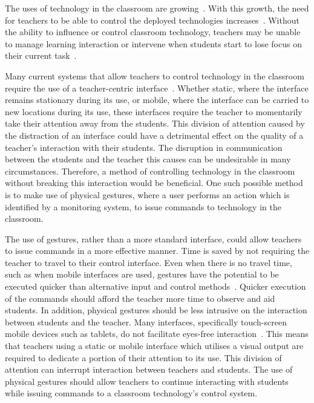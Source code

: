 \documentclass[manuscript, review, screen]{acmart}
\begin{document}
The uses of technology in the classroom are growing~\cite{Lloyd2011,Robertson2012,Schrum2008}.
With this growth, the need for teachers to be able to control the deployed technologies increases~\cite{Apple1990,Selwyn2010,Selwyn2011}.
Without the ability to influence or control classroom technology, teachers may be unable to manage learning interaction or intervene when students start to lose focus on their current task~\cite{Chen2005,Karabenick2011}.

Many current systems that allow teachers to control technology in the classroom require the use of a teacher-centric interface~\cite{Dagdag2011,Kuhn2005,Vila,Zhou2010}.
Whether static, where the interface remains stationary during its use, or mobile, where the interface can be carried to new locations during its use, these interfaces require the teacher to momentarily take their attention away from the students.
This division of attention caused by the distraction of an interface could have a detrimental effect on the quality of a teacher's interaction with their students.
The disruption in communication between the students and the teacher this causes can be undesirable in many circumstances.
Therefore, a method of controlling technology in the classroom without breaking this interaction would be beneficial.
One such possible method is to make use of physical gestures, where a user performs an action which is identified by a monitoring system, to issue commands to technology in the classroom.

The use of gestures, rather than a more standard interface, could allow teachers to issue commands in a more effective manner.
Time is saved by not requiring the teacher to travel to their control interface.
Even when there is no travel time, such as when mobile interfaces are used, gestures have the potential to be executed quicker than alternative input and control methods~\cite{Dulberg1999,Moyle2001}.
Quicker execution of the commands should afford the teacher more time to observe and aid students.
In addition, physical gestures should be less intrusive on the interaction between students and the teacher. 
Many interfaces, specifically touch-screen mobile devices such as tablets, do not facilitate eyes-free interaction~\cite{Brewster2003}.
This means that teachers using a static or mobile interface which utilises a visual output are required to dedicate a portion of their attention to its use.
This division of attention can interrupt interaction between teachers and students.
The use of physical gestures should allow teachers to continue interacting with students while issuing commands to a classroom technology's control system.
\end{document}

